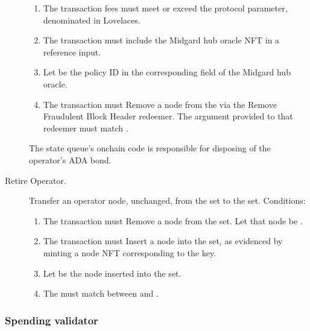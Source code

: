 \documentclass[../midgard.tex]{subfiles}
\begin{document}
\begin{description}
\begin{enumerate}
            \item The transaction fees must meet or exceed the  protocol parameter, denominated in Lovelaces.
            \item The transaction must include the Midgard hub oracle NFT in a reference input. 
            \item Let  be the policy ID in the corresponding field of the Midgard hub oracle.
            \item The transaction must Remove a node from the  via the Remove Fraudulent Block Header redeemer. The  argument provided to that redeemer must match .
        \end{enumerate}

        The state queue's onchain code is responsible for disposing of the operator's ADA bond.
    \item[Retire Operator.] Transfer an operator node, unchanged, from the  set to the  set. Conditions:
        \begin{enumerate}
            \item The transaction must Remove a node from the  set. Let that node be .
            \item The transaction must Insert a node into the  set, as evidenced by minting a  node NFT corresponding to the  key.
            \item Let  be the node inserted into the  set.
            \item The  must match between  and .
        \end{enumerate}
\end{description}

\subsubsection{Spending validator}
\label{h:active-operators-spending-validator}
\end{document}
